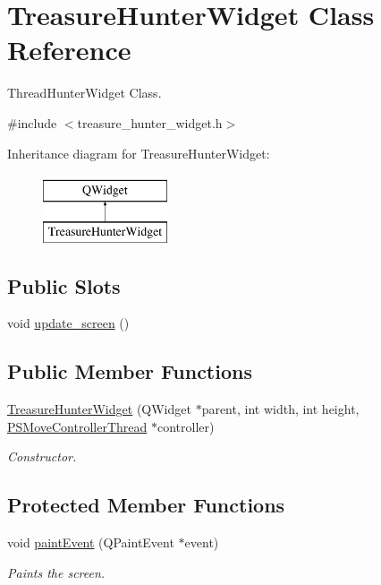 \hypertarget{class_treasure_hunter_widget}{\section{Treasure\-Hunter\-Widget Class Reference}
\label{class_treasure_hunter_widget}
}


Thread\-Hunter\-Widget Class.  




{\ttfamily \#include $<$treasure\-\_\-hunter\-\_\-widget.\-h$>$}

Inheritance diagram for Treasure\-Hunter\-Widget\-:\begin{figure}[H]
\begin{center}
\leavevmode
\includegraphics[height=2.000000cm]{class_treasure_hunter_widget}
\end{center}
\end{figure}
\subsection*{Public Slots}
\begin{DoxyCompactItemize}
\item 
void \hyperlink{class_treasure_hunter_widget_a1f770e67fe7b2af819a226f07a1858ab}{update\-\_\-screen} ()
\end{DoxyCompactItemize}
\subsection*{Public Member Functions}
\begin{DoxyCompactItemize}
\item 
\hyperlink{class_treasure_hunter_widget_aafd12f16d20308347b8a7249ce34eb7c}{Treasure\-Hunter\-Widget} (Q\-Widget $\ast$parent, int width, int height, \hyperlink{class_p_s_move_controller_thread}{P\-S\-Move\-Controller\-Thread} $\ast$controller)
\begin{DoxyCompactList}\small\item\em Constructor. \end{DoxyCompactList}\end{DoxyCompactItemize}
\subsection*{Protected Member Functions}
\begin{DoxyCompactItemize}
\item 
void \hyperlink{class_treasure_hunter_widget_a5b3fabbe6e3e50cda3ce8335bd8580e7}{paint\-Event} (Q\-Paint\-Event $\ast$event)
\begin{DoxyCompactList}\small\item\em Paints the screen. \end{DoxyCompactList}\end{DoxyCompactItemize}


